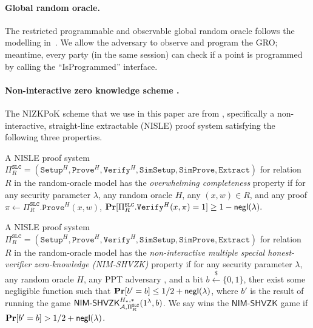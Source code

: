 

\paragraph{Global random oracle.}
%
The restricted programmable and observable global random oracle \funcGrpoRO follows the modelling in~\cite{EC:CDGLN18}.
%
We allow the adversary to observe and program the GRO; meantime, every party (in the same session) can check if a point is programmed by calling the ``IsProgrammed'' interface.



\paragraph{Non-interactive zero knowledge scheme \NIZK.}
%
The NIZKPoK scheme that we use in this paper are from \cite{TCC:LysRos22}, specifically a non-interactive, straight-line extractable (NISLE) proof
system satisfying the following three properties.

\begin{definition}
    \label{def:overwhelming-completeness}

    A NISLE proof system $\Pi^{\mathtt{SLC}}_R = (\mathtt{Setup}^H, \mathtt{Prove}^H,\allowbreak \mathtt{Verify}^H, \mathtt{SimSetup}, \mathtt{SimProve}, \mathtt{Extract})$ for relation $R$ in the random-oracle model has the \emph{overwhelming completeness} property if for any security parameter $\lambda$, any random oracle $H$, any $(x, w) \in R$, and any proof $\pi \gets \Pi^{\mathtt{SLC}}_R.\mathtt{Prove}^H(x, w)$,
    \( \mathbf{Pr}[\Pi^{\mathtt{SLC}}_R.\mathtt{Verify}^H(x, \pi) = 1] \ge 1 - \mathsf{negl}(\lambda). \)
\end{definition}

\begin{definition}
    \label{def:non-interactive-multiple-SHVZK}
    
    A NISLE proof system $\Pi^{\mathtt{SLC}}_R = (\mathtt{Setup}^H,\allowbreak \mathtt{Prove}^H,\allowbreak \mathtt{Verify}^H,\allowbreak \mathtt{SimSetup},\allowbreak \mathtt{SimProve},\allowbreak \mathtt{Extract})$ for relation $R$ in the random-oracle model has the \emph{non-interactive multiple special honest-verifier zero-knowledge (NIM-SHVZK)} property if for any security parameter $\lambda$, any random oracle $H$, any PPT adversary \adv, and a bit $b \overset{\$}{\gets} \{0, 1\}$, ther exist some negligible function \negl such that $\mathbf{Pr}[b' = b] \le 1 /2 + \mathsf{negl}(\lambda)$, where $b'$ is the result of running the game $\mathsf{NIM}\text{-}\mathsf{SHVZK}^{H_*, *}_{\mathcal{A}, \Pi^{\mathtt{SLC}}_R} (1^\lambda, b)$.
    We say \adv wins the $\mathsf{NIM}\text{-}\mathsf{SHVZK}$ game if $\mathbf{Pr}[b' = b] > 1 / 2 + \mathsf{negl}(\lambda)$.
\end{definition}

